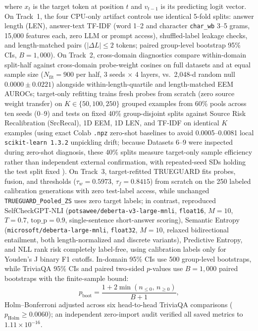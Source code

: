 \documentclass[10pt,twocolumn,letterpaper]{article}
\begin{document}
where $x_t$ is the target token at position $t$ and $v_{t-1}$ is its predicting logit vector. On Track~1, the four CPU-only artifact controls use identical 5-fold splits: answer length (LEN), answer-text TF-IDF (word 1--2 and character \texttt{char\_wb} 3--5 grams, 15,000 features each, zero LLM or prompt access), shuffled-label leakage checks, and length-matched pairs ($|\Delta L| \le 2$ tokens; paired group-level bootstrap 95\% CIs, $B = 1{,}000$). On Track~2, cross-domain diagnostics compare within-domain split-half against cross-domain probe-weight cosines on full datasets and at equal sample size ($N_{\text{fit}} = 900$ per half, 3 seeds $\times$ 4 layers, vs.\ 2,048-d random null $0.0000 \pm 0.0221$) alongside within-length-quartile and length-matched EEM AUROCs; target-only refitting trains fresh probes from scratch (zero source weight transfer) on $K \in \{50, 100, 250\}$ grouped examples from 60\% pools across ten seeds (0--9) and tests on fixed 40\% group-disjoint splits against Source Risk Recalibration (SrcRecal), 1D EEM, 1D LEN, and TF-IDF on identical $K$ examples (using exact Colab \texttt{.npz} zero-shot baselines to avoid 0.0005--0.0081 local \texttt{scikit-learn 1.3.2} unpickling drift; because Datasets 6--9 were inspected during zero-shot diagnosis, these 40\% splits measure target-only sample efficiency rather than independent external confirmation, with repeated-seed SDs holding the test split fixed \cite{nadeau2003inference}). On Track~3, target-refitted TRUEGUARD fits probes, fusion, and thresholds ($\tau_w = 0.5973$, $\tau_f = 0.8415$) from scratch on the 250 labeled calibration generations with zero test-label access, while unchanged \texttt{TRUEGUARD\_Pooled\_ZS} uses zero target labels; in contrast, reproduced SelfCheckGPT-NLI \cite{review21} (\texttt{potsawee/\allowbreak deberta-v3-large-mnli}, \texttt{float16}, $M = 10$, $T = 0.7$, $\text{top\_p} = 0.9$, single-sentence short-answer scoring), Semantic Entropy \cite{kuhn2023semantic,farquhar2024detecting} (\texttt{microsoft/\allowbreak deberta-large-mnli}, \texttt{float32}, $M = 10$, relaxed bidirectional entailment, both length-normalized and discrete variants), Predictive Entropy, and NLL rank risk completely label-free, using calibration labels only for Youden's J binary F1 cutoffs. In-domain 95\% CIs use 500 group-level bootstraps, while TriviaQA 95\% CIs and paired two-sided $p$-values use $B = 1{,}000$ paired bootstraps with the finite-sample bound:
\begin{equation}
p_{\text{boot}} = \frac{1 + 2 \min(n_{\le 0},\, n_{\ge 0})}{B + 1},
\label{eq:pboot}
\end{equation}
Holm--Bonferroni adjusted across six head-to-head TriviaQA comparisons ($p_{\text{Holm}} \ge 0.0060$); an independent zero-import audit verified all saved metrics to $1.11 \times 10^{-16}$.
\end{document}
